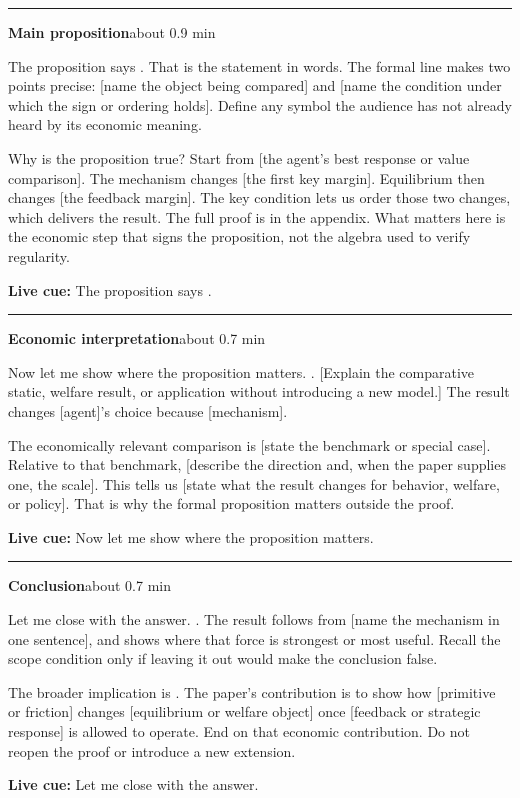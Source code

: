 \documentclass[11pt]{article}
\newcommand{\Cue}[1]{\par\nobreak\smallskip\noindent
  \textcolor{ScriptGray}{\footnotesize\textbf{Live cue:} #1}\par}
\newcommand{\scriptframe}[3]{%
  \Needspace{9\baselineskip}%
  \par\medskip\noindent\textcolor{ScriptBlue}{\rule{\linewidth}{0.55pt}}%
  \par\smallskip\noindent
  \textbf{#1}\hfill\textcolor{ScriptGray}{\small #2}\par\smallskip
  #3\par}
\begin{document}
\scriptframe{Main proposition}{about 0.9 min}{%
  The proposition says \ResultHeadlineSpoken. That is the statement in words.
  The formal line makes two points precise: [name the object being compared]
  and [name the condition under which the sign or ordering holds]. Define any
  symbol the audience has not already heard by its economic meaning.

  Why is the proposition true? Start from [the agent's best response or value
  comparison]. The mechanism changes [the first key margin]. Equilibrium then
  changes [the feedback margin]. The key condition lets us order
  those two changes, which delivers the result. The full proof is in the
  appendix. What matters here is the economic step that signs the proposition,
  not the algebra used to verify regularity.
  \Cue{The proposition says \ResultHeadlineSpoken.}
}

\scriptframe{Economic interpretation}{about 0.7 min}{%
  Now let me show where the proposition matters. \ResultSupportSpoken. [Explain the
  comparative static, welfare result, or application without introducing a
  new model.] The result changes [agent]'s choice because [mechanism].

  The economically relevant comparison is [state the benchmark or special
  case]. Relative to that benchmark, [describe the direction and, when the
  paper supplies one, the scale]. This tells us [state what the result changes
  for behavior, welfare, or policy]. That is why the formal proposition matters
  outside the proof.
  \Cue{Now let me show where the proposition matters.}
}

\begin{samepage}
\scriptframe{Conclusion}{about 0.7 min}{%
  Let me close with the answer. \ResultHeadlineSpoken. The result follows from
  [name the mechanism in one sentence], and \ResultSupportSpoken{} shows where
  that force is strongest or most useful. Recall the scope condition only if
  leaving it out would make the conclusion false.

  The broader implication is \ResultImplicationSpoken. The paper's
  contribution is to show how [primitive or friction] changes [equilibrium or
  welfare object] once [feedback or strategic response] is allowed to operate.
  End on that economic contribution. Do not reopen the proof or introduce a
  new extension.
  \Cue{Let me close with the answer.}
}
\end{samepage}
\end{document}
